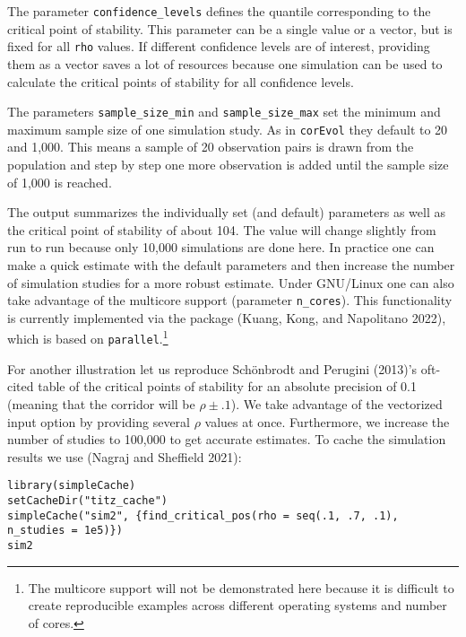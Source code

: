The parameter \texttt{confidence\_levels} defines the quantile corresponding to the critical point of stability. This parameter can be a single value or a vector, but is fixed for all \texttt{rho} values. If different confidence levels are of interest, providing them as a vector saves a lot of resources because one simulation can be used to calculate the critical points of stability for all confidence levels.

The parameters \texttt{sample\_size\_min} and \texttt{sample\_size\_max} set the minimum and maximum sample size of one simulation study. As in \texttt{corEvol} they default to 20 and 1,000. This means a sample of 20 observation pairs is drawn from the population and step by step one more observation is added until the sample size of 1,000 is reached.

The output summarizes the individually set (and default) parameters as well as the critical point of stability of about 104. The value will change slightly from run to run because only 10,000 simulations are done here. In practice one can make a quick estimate with the default parameters and then increase the number of simulation studies for a more robust estimate. Under GNU/Linux one can also take advantage of the multicore support (parameter \texttt{n\_cores}). This functionality is currently implemented via the  package (Kuang, Kong, and Napolitano 2022), which is based on \texttt{parallel}.\footnote{The multicore support will not be demonstrated here because it is difficult to create reproducible examples across different operating systems and number of cores.}

For another illustration let us reproduce Schönbrodt and Perugini (2013)'s oft-cited table of the critical points of stability for an absolute precision of 0.1 (meaning that the corridor will be \(\rho\pm.1\)). We take advantage of the vectorized input option by providing several \(\rho\) values at once. Furthermore, we increase the number of studies to 100,000 to get accurate estimates. To cache the simulation results we use  (Nagraj and Sheffield 2021):

\begin{verbatim}
library(simpleCache)
setCacheDir("titz_cache")
simpleCache("sim2", {find_critical_pos(rho = seq(.1, .7, .1), n_studies = 1e5)})
sim2
\end{verbatim}

